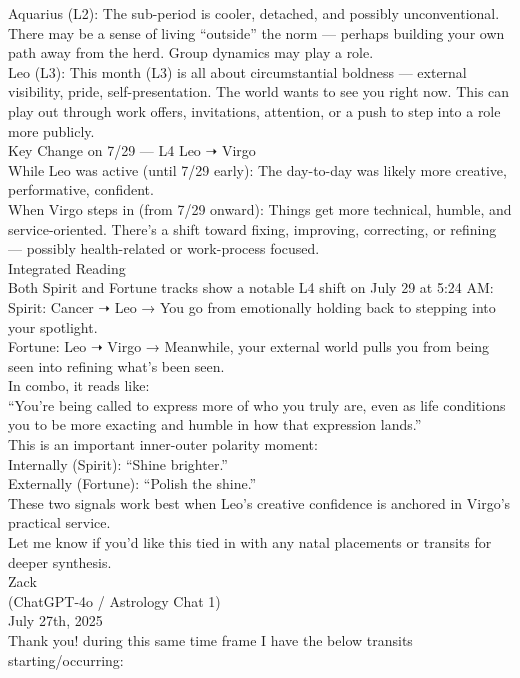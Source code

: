 \documentclass{article}
\begin{document}
Aquarius (L2): The sub-period is cooler, detached, and possibly unconventional. There may be a sense of living ``outside'' the norm --- perhaps building your own path away from the herd. Group dynamics may play a role.\\
Leo (L3): This month (L3) is all about circumstantial boldness --- external visibility, pride, self-presentation. The world wants to see you right now. This can play out through work offers, invitations, attention, or a push to step into a role more publicly.\\
Key Change on 7/29 --- L4 Leo ➝ Virgo\\
While Leo was active (until 7/29 early): The day-to-day was likely more creative, performative, confident.\\
When Virgo steps in (from 7/29 onward): Things get more technical, humble, and service-oriented. There's a shift toward fixing, improving, correcting, or refining --- possibly health-related or work-process focused.\\
Integrated Reading\\
Both Spirit and Fortune tracks show a notable L4 shift on July 29 at 5:24 AM:\\
Spirit: Cancer ➝ Leo → You go from emotionally holding back to stepping into your spotlight.\\
Fortune: Leo ➝ Virgo → Meanwhile, your external world pulls you from being seen into refining what's been seen.\\
In combo, it reads like:\\
``You're being called to express more of who you truly are, even as life conditions you to be more exacting and humble in how that expression lands.''\\
This is an important inner-outer polarity moment:\\
Internally (Spirit): ``Shine brighter.''\\
Externally (Fortune): ``Polish the shine.''\\
These two signals work best when Leo's creative confidence is anchored in Virgo's practical service.\\
Let me know if you'd like this tied in with any natal placements or transits for deeper synthesis.\\
Zack\\
(ChatGPT-4o / Astrology Chat 1)\\
July 27th, 2025\\
Thank you! during this same time frame I have the below transits starting/occurring:\\
\end{document}
